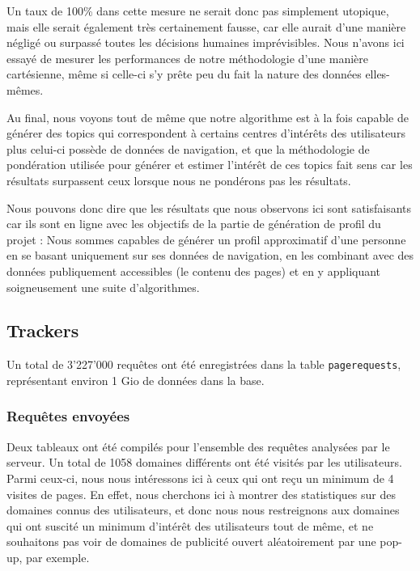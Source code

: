 			Un taux de 100\% dans cette mesure ne serait donc pas simplement utopique, mais elle serait également très certainement fausse, car elle aurait d'une manière négligé ou surpassé toutes les décisions humaines imprévisibles. Nous n'avons ici essayé de mesurer les performances de notre méthodologie d'une manière cartésienne, même si celle-ci s'y prête peu du fait la nature des données elles-mêmes.

			Au final, nous voyons tout de même que notre algorithme est à la fois capable de générer des topics qui correspondent à certains centres d'intérêts des utilisateurs plus celui-ci possède de données de navigation, et que la méthodologie de pondération utilisée pour générer et estimer l'intérêt de ces topics fait sens car les résultats surpassent ceux lorsque nous ne pondérons pas les résultats.

			Nous pouvons donc dire que les résultats que nous observons ici sont satisfaisants car ils sont en ligne avec les objectifs de la partie de génération de profil du projet : Nous sommes capables de générer un profil approximatif d'une personne en se basant uniquement sur ses données de navigation, en les combinant avec des données publiquement accessibles (le contenu des pages) et en y appliquant soigneusement une suite d'algorithmes.

%
%
%
%
%
%


\clearpage

	\subsection{Trackers}

		Un total de 3'227'000 requêtes ont été enregistrées dans la table \texttt{pagerequests}, représentant environ 1 Gio de données dans la base. 

		\subsubsection{Requêtes envoyées}

			Deux tableaux ont été compilés pour l'ensemble des requêtes analysées par le serveur. Un total de 1058 domaines différents ont été visités par les utilisateurs. Parmi ceux-ci, nous nous intéressons ici à ceux qui ont reçu un minimum de 4 visites de pages. En effet, nous cherchons ici à montrer des statistiques sur des domaines connus des utilisateurs, et donc nous nous restreignons aux domaines qui ont suscité un minimum d'intérêt des utilisateurs tout de même, et ne souhaitons pas voir de domaines de publicité ouvert aléatoirement par une pop-up, par exemple.


